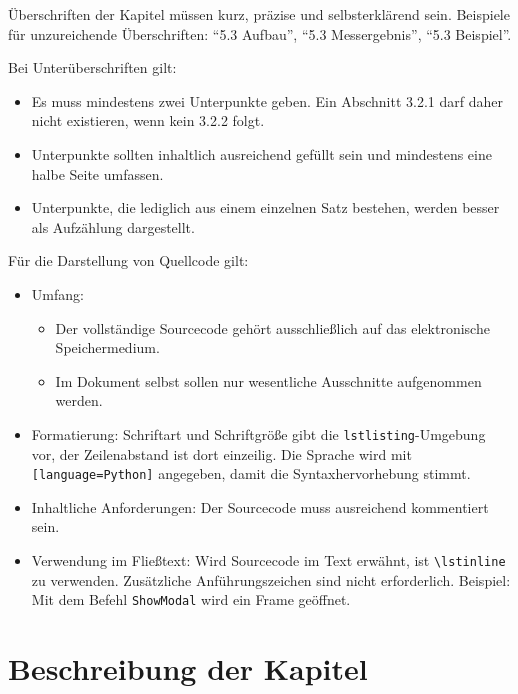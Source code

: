 Überschriften der Kapitel müssen kurz, präzise und selbsterklärend sein.
Beispiele für unzureichende Überschriften: \enquote{5.3 Aufbau},
\enquote{5.3 Messergebnis}, \enquote{5.3 Beispiel}.

Bei Unterüberschriften gilt:

\begin{itemize}
  \item Es muss mindestens zwei Unterpunkte geben. Ein Abschnitt 3.2.1 darf
        daher nicht existieren, wenn kein 3.2.2 folgt.
  \item Unterpunkte sollten inhaltlich ausreichend gefüllt sein und
        mindestens eine halbe Seite umfassen.
  \item Unterpunkte, die lediglich aus einem einzelnen Satz bestehen, werden
        besser als Aufzählung dargestellt.
\end{itemize}

Für die Darstellung von Quellcode gilt:

\begin{itemize}
  \item Umfang:
        \begin{itemize}
          \item Der vollständige Sourcecode gehört ausschließlich auf das
                elektronische Speichermedium.
          \item Im Dokument selbst sollen nur wesentliche Ausschnitte
                aufgenommen werden.
        \end{itemize}
  \item Formatierung: Schriftart und Schriftgröße gibt die
        \lstinline|lstlisting|-Umgebung vor, der Zeilenabstand ist dort
        einzeilig. Die Sprache wird mit
        \lstinline|[language=Python]| angegeben, damit die
        Syntaxhervorhebung stimmt.
  \item Inhaltliche Anforderungen: Der Sourcecode muss ausreichend
        kommentiert sein.
  \item Verwendung im Fließtext: Wird Sourcecode im Text erwähnt, ist
        \lstinline|\lstinline| zu verwenden. Zusätzliche Anführungszeichen
        sind nicht erforderlich. Beispiel: Mit dem Befehl
        \lstinline|ShowModal| wird ein Frame geöffnet.
\end{itemize}

\section{Beschreibung der Kapitel}

